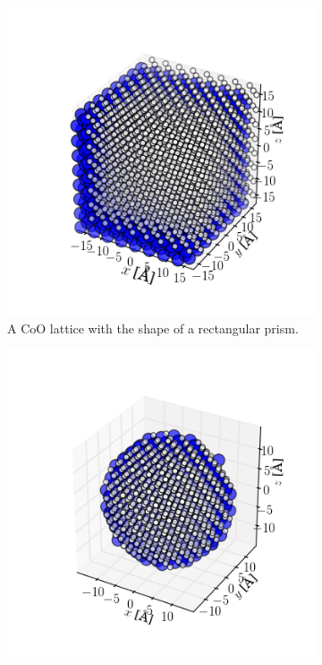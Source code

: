 \documentclass[11pt,twoside]{report}
\newcommand{\chem}[1]{\ensuremath{\mathrm{#1}}}
\begin{document}
\begin{figure}[htbp]
	\centering
	\begin{subfigure}{0.45\textwidth}
	  \includegraphics[width=\textwidth]{img/lattice_uncropped.png}
	  \caption{A \chem{CoO} lattice with the shape of a rectangular prism.}
	  \label{fig:uncropped_lattice}	
	\end{subfigure}
	\hspace{5mm}
	\begin{subfigure}{0.45\textwidth}
	  \includegraphics[width=\textwidth]{img/lattice_cropped.png}

\end{subfigure}
\end{figure}
\end{document}
